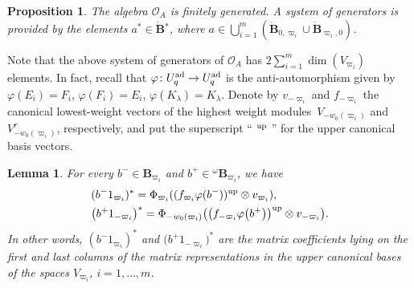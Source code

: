 \documentclass[10pt,a4paper]{amsart}
\numberwithin{equation}{section}
\newtheorem{lem}[teo]{Lemma}
\newtheorem{prop}[teo]{Proposition}
\theoremstyle{definition}
\newcommand{\Oo}{{\mathcal O}}
\newcommand{\ra}{\rightarrow}
\begin{document}
\begin{prop}\label{genOA} The algebra $\Oo_A$ is finitely generated. A system of generators is provided by the elements $a^*\in \dot {\mathbf{B}} {}^*$, where $a \in \bigcup_{i=1}^m (\dot{\mathbf{B}}_{0,\varpi_i}\cup \dot{\mathbf{B}}_{\varpi_i,0})$.\end{prop}
Note that the above system of generators of $\Oo_A$ has
$2 \sum_{i=1}^m \dim(V_{\varpi_i})$
 elements. In fact, recall that $\varphi\colon U_q^{\rm ad} \ra U_q^{\rm ad}$ is the anti-automorphism given by $\varphi(E_i) = F_i$, $\varphi(F_i) = E_i$, $\varphi(K_\lambda) = K_{\lambda}$. Denote by $v_{-\varpi_i}$ and $f_{-\varpi_i}$ the canonical lowest-weight vectors of the highest weight modules~${V_{-w_0(\varpi_i)}}$ and $V_{-w_0(\varpi_i)}^r$, respectively, and put the superscript `` ${}^{\rm up}$ '' for the upper canonical basis vectors.
\begin{lem} For every $b^- \in \mathbf{B}_{\varpi_i}$ and $b^+\in {}^\omega \mathbf{B}_{\varpi_i}$, we have
\begin{align}
 &(b^-1_{\varpi_i})^* = \Phi_{\varpi_i}((f_{\varpi_i} \varphi(b^-))^{\rm up} \otimes v_{\varpi_i}), \label{formgenOA1} \\
 &\big(b^+1_{-\varpi_i}\big)^* = \Phi_{-w_0(\varpi_i)}\big(\big(f_{-\varpi_i} \varphi\big(b^+\big)\big)^{\rm up} \otimes v_{-\varpi_i}\big). \label{formgenOA2} \end{align}
In other words, $(b^-1_{\varpi_i})^*$ and $\big(b^+1_{-\varpi_i}\big)^*$ are the matrix coefficients lying on the first and last columns of the matrix representations in the upper canonical bases of the spaces $V_{\varpi_i}$, ${i=1,\dots, m}$.
\end{lem}
\end{document}
